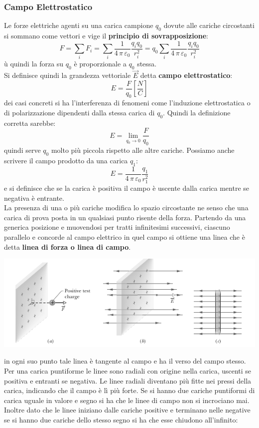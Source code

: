 \documentclass[a4paper,12pt, oneside]{book}
\begin{document}
\subsubsection{Campo Elettrostatico}
Le forze elettriche agenti su una carica campione $q_0$ dovute alle cariche circostanti si sommano come vettori e vige il \textbf{principio di sovrapposizione}:
$$F=\sum_i F_i=\sum_i \frac{1}{4\,\pi\,\varepsilon_0}\frac{q_iq_0}{r_i^2}=q_0\sum_i\frac{1}{4\,\pi\,\varepsilon_0}\frac{q_iq_0}{r_i^2}$$ù
quindi la forza su $q_0$ è proporzionale a $q_0$ stessa.\\
Si definisce quindi la grandezza vettoriale $\vec{E}$ detta \textbf{campo elettrostatico}:
$$E=\frac{F}{q_0}\left[\frac{N}{C}\right]$$
dei casi concreti si ha l'interferenza di fenomeni come l'induzione elettrostatica o di polarizzazione dipendenti dalla stessa carica di $q_0$. Quindi la definizione corretta sarebbe:
$$E=\lim_{q_0\to 0}\frac{F}{q_0}$$
quindi serve $q_0$ molto più piccola rispetto alle altre cariche. Possiamo anche scrivere il campo prodotto da una carica $q_1$:
$$E=\frac{1}{4\,\pi\,\varepsilon_0}\frac{q_1}{r_1^2}$$
e si definisce che se la carica è positiva il campo è uscente dalla carica mentre se negativa è entrante.\\
La presenza di una o più cariche modifica lo spazio circostante ne senso che una carica di prova posta in un qualsiasi punto risente della forza. Partendo da una generica posizione e muovendosi per tratti infinitesimi successivi, ciascuno parallelo e concorde al campo elettrico in quel campo si ottiene una linea che è detta \textbf{linea di forza o linea di campo}.
\begin{center}
\includegraphics[scale=0.7]{img/ele.png}
\end{center}
in ogni suo punto tale linea è tangente al campo e ha il verso del campo stesso. Per una carica puntiforme le linee sono radiali con origine nella carica, uscenti se positiva e entranti se negativa. Le linee radiali diventano più fitte nei pressi della carica, indicando che il campo è lì più forte. Se si hanno due cariche puntiformi di carica uguale in valore e segno si ha che le linee di campo non si incrociano mai. Inoltre dato che le linee iniziano dalle cariche positive e terminano nelle negative se si hanno due cariche dello stesso segno si ha che esse chiudono all'infinito:
\end{document}
